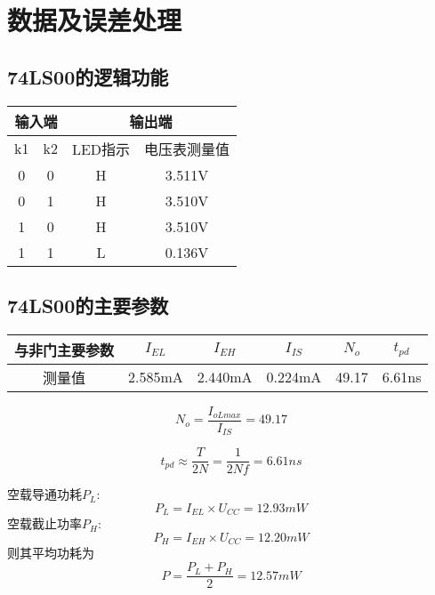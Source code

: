 \documentclass{article}
\begin{document}
\newpage


\section{ 数据及误差处理}
\subsection{74LS00的逻辑功能}
\begin{table}[h]
    \centering  
    \begin{tabular}{c|c|c|c}
        \hline
        \multicolumn{2}{c}{输入端} \vline  &  \multicolumn{2}{c}{输出端} \vline \\ \hline
              k1            & k2           &  LED指示          &  电压表测量值 \\ \hline
              0             & 0            &   H               &  3.511V             \\ \hline
              0             & 1            &   H               &  3.510V          \\ \hline
              1             & 0            &   H               &   3.510V     \\ \hline
              1             & 1            &   L               &   0.136V     \\ \hline
    \end{tabular}
  \end{table}




\subsection{74LS00的主要参数}
\begin{table}[h]
    \centering  
    \begin{tabular}{c|c|c|c|c|c}
        \hline
           与非门主要参数    & $I_{EL}$         & $I_{EH}$    & $I_{IS}$   &  $N_o$  &  $t_{pd}$ \\ \hline
              测量值         & 2.585mA          &  2.440mA    &   0.224mA  &  49.17     & 6.61ns      \\ \hline
        \end{tabular}
\end{table}
\[N_o=\frac{I_{oLmax}}{I_{IS}}=49.17\]

\[t_{pd}\approx \frac{T}{2N}=\frac{1}{2Nf}=6.61ns \]

空载导通功耗$P_L$:
             \[P_L=I_{EL}\times U_{CC}=12.93mW\]
空载截止功率$P_H$:
             \[P_H=I_{EH}\times U_{CC}=12.20mW\]
则其平均功耗为
             \[P=\frac{P_L+P_H}{2}=12.57mW\]
\end{document}
